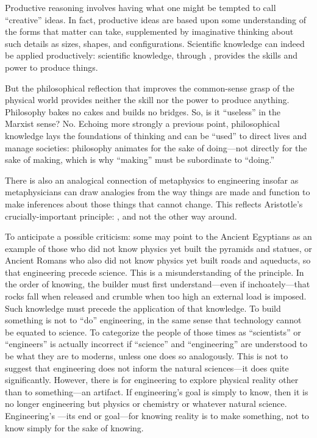 Productive reasoning involves having what one might be tempted to call ``creative'' ideas. In fact, productive ideas are based upon some understanding of the forms that matter can take, supplemented by imaginative thinking about such details as sizes, shapes, and configurations. Scientific knowledge can indeed be applied productively: scientific knowledge, through , provides the skills and power to produce things.

But the philosophical reflection that improves the common-sense grasp of the physical world provides neither the skill nor the power to produce anything. Philosophy bakes no cakes and builds no bridges. So, is it ``useless'' in the Marxist sense? No. Echoing more strongly a previous point, philosophical knowledge lays the foundations of thinking and can be ``used'' to direct lives and manage societies: philosophy animates for the sake of doing---not directly for the sake of making, which is why ``making'' must be subordinate to ``doing.''

There is also an analogical connection of metaphysics to engineering insofar as metaphysicians can draw analogies from the way things are made and function to make inferences about those things that cannot change. This reflects Aristotle's crucially-important principle: , and not the other way around.

To anticipate a possible criticism: some may point to the Ancient Egyptians as an example of those who did not know physics yet built the pyramids and statues, or Ancient Romans who also did not know physics yet built roads and aqueducts, so that engineering  precede science. This is a misunderstanding of the principle. In the order of knowing, the builder must first understand---even if inchoately---that rocks fall when released and crumble when too high an external load is imposed. Such knowledge must precede the application of that knowledge. To build something is not to ``do'' engineering, in the same sense that technology cannot be equated to science. To categorize the people of those times as ``scientists'' or ``engineers'' is actually incorrect if ``science'' and ``engineering'' are understood to be what they are to moderns, unless one does so analogously. This is not to suggest that engineering does not inform the natural sciences---it does quite significantly. However, there is  for engineering to explore physical reality other than to  something---an artifact. If engineering's goal is simply to know, then it is no longer engineering but physics or chemistry or whatever natural science. Engineering's ---its end or goal---for knowing reality is to make something, not to know simply for the sake of knowing.

